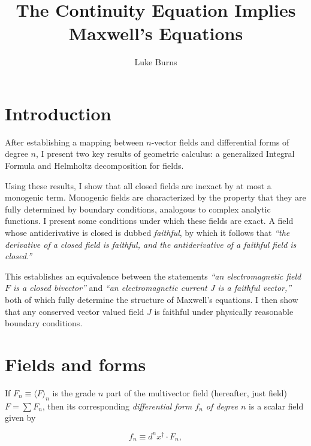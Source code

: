 \documentclass{article}
\title{The Continuity Equation Implies Maxwell's Equations}
\author{Luke Burns}
\begin{document}
\maketitle
{}

\section{Introduction}

After establishing a mapping between $n$-vector fields and differential forms of degree $n$, I present two key results of geometric calculus: a generalized Integral Formula and Helmholtz decomposition for fields. 

Using these results, I show that all closed fields are inexact by at most a monogenic term. Monogenic fields are characterized by the property that they are fully determined by boundary conditions, analogous to complex analytic functions. I present some conditions under which these fields are exact. A field whose antiderivative is closed is dubbed \emph{faithful}, by which it follows that \emph{``the derivative of a closed field is faithful, and the antiderivative of a faithful field is closed.''}

This establishes an equivalence between the statements \emph{``an electromagnetic field $F$ is a closed bivector''} and \emph{``an electromagnetic current $J$ is a faithful vector,''} both of which fully determine the structure of Maxwell's equations. I then show that any conserved vector valued field $J$ is faithful under physically reasonable boundary conditions.

\section{Fields and forms} If $F_n \equiv \langle F \rangle_n$ is the grade $n$ part of the multivector field (hereafter, just field) $F = \sum F_n$, then its corresponding \emph{differential form $f_n$ of degree $n$} is a scalar field given by \cite{cagc}

\begin{equation}
  f_n \equiv d^nx^\dagger \cdot F_n,\label{eq:form}
\end{equation}
\end{document}
